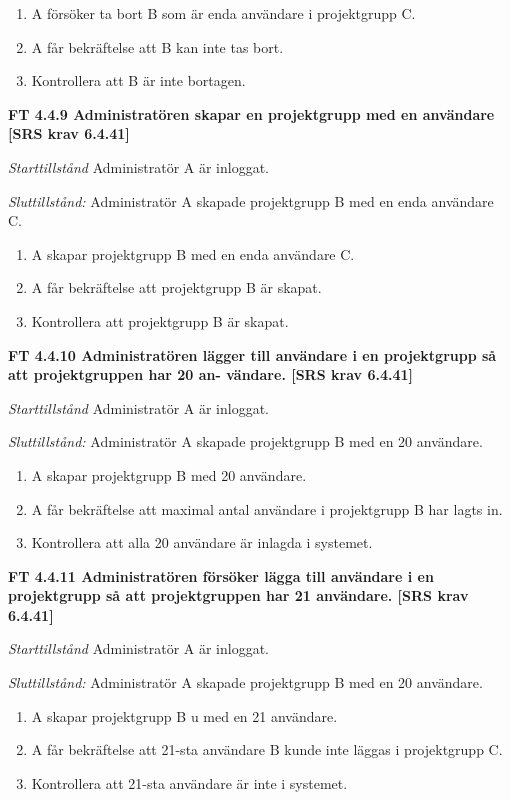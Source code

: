 \documentclass[a4paper]{article}
\begin{document}
\begin{enumerate}
\item A försöker ta bort B som är enda användare i projektgrupp C.
\item A får bekräftelse att B kan inte tas bort.
\item Kontrollera att B är inte bortagen.
\end{enumerate}

\textbf{FT 4.4.9 Administratören skapar en projektgrupp med en användare [SRS krav 6.4.41]}

\emph{Starttillstånd} Administratör A är inloggat. 

\emph{Sluttillstånd:} Administratör A  skapade  projektgrupp B med en enda användare C.

\begin{enumerate}
\item A skapar projektgrupp B med en enda användare C.
\item A får bekräftelse att projektgrupp B är skapat.
\item Kontrollera att projektgrupp B är skapat.
\end{enumerate}

\textbf{FT 4.4.10 Administratören lägger till användare i en projektgrupp så att projektgruppen har 20 an- vändare. [SRS krav 6.4.41]}

\emph{Starttillstånd} Administratör A är inloggat.

\emph{Sluttillstånd:} Administratör A  skapade  projektgrupp B med en 20  användare.

\begin{enumerate}
\item A skapar projektgrupp B med 20 användare.
\item A får bekräftelse att maximal antal användare i projektgrupp B  har lagts in.
\item Kontrollera att alla 20 användare är inlagda i systemet.
\end{enumerate}

\textbf{FT 4.4.11 Administratören försöker lägga till användare i en projektgrupp så att projektgruppen har 21 användare. [SRS krav 6.4.41]}

\emph{Starttillstånd} Administratör A är inloggat.

\emph{Sluttillstånd:} Administratör A  skapade  projektgrupp B med en 20  användare.

\begin{enumerate}
\item A skapar projektgrupp B u med en 21  användare.
\item A får bekräftelse att 21-sta användare B kunde inte läggas i projektgrupp C.
\item Kontrollera att 21-sta användare är inte i systemet.
\end{enumerate}
\end{document}
